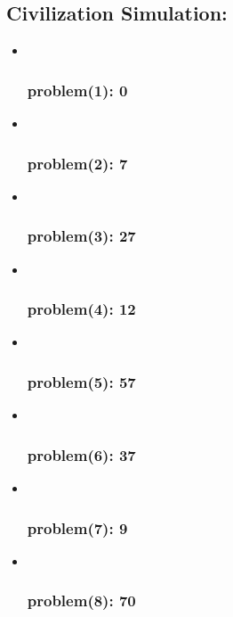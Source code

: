 \documentclass[11pt]{article}
\begin{document}
\hypertarget{civilization-simulation}{%
\subsection{\texorpdfstring{ Civilization
Simulation:}{  Civilization Simulation:}}\label{civilization-simulation}}

\begin{itemize}
\item ~
  \hypertarget{problem1-0-1}{%
  \subsubsection{\texorpdfstring{ problem(1):
  0}{  problem(1): 0}}\label{problem1-0-1}}
\item ~
  \hypertarget{problem2-7}{%
  \subsubsection{\texorpdfstring{ problem(2):
  7}{  problem(2): 7}}\label{problem2-7}}
\item ~
  \hypertarget{problem3-27}{%
  \subsubsection{\texorpdfstring{ problem(3):
  27}{  problem(3): 27}}\label{problem3-27}}
\item ~
  \hypertarget{problem4-12}{%
  \subsubsection{\texorpdfstring{ problem(4):
  12}{  problem(4): 12}}\label{problem4-12}}
\item ~
  \hypertarget{problem5-57}{%
  \subsubsection{\texorpdfstring{ problem(5):
  57}{  problem(5): 57}}\label{problem5-57}}
\item ~
  \hypertarget{problem6-37-1}{%
  \subsubsection{\texorpdfstring{ problem(6):
  37}{  problem(6): 37}}\label{problem6-37-1}}
\item ~
  \hypertarget{problem7-9}{%
  \subsubsection{\texorpdfstring{ problem(7):
  9}{  problem(7): 9}}\label{problem7-9}}
\item ~
  \hypertarget{problem8-70}{%
  \subsubsection{\texorpdfstring{ problem(8):
  70}{  problem(8): 70}}\label{problem8-70}}
\end{itemize}
\end{document}
